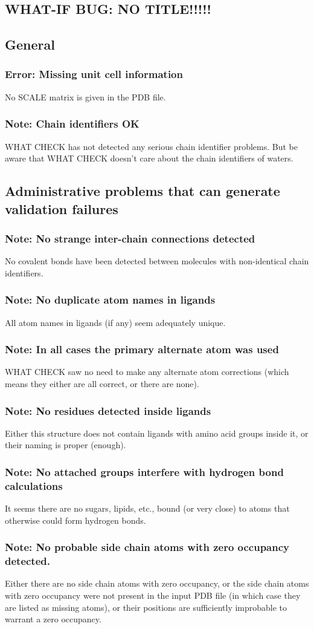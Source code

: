 \documentclass[a4paper]{article}
\def\showsect#1{
  \thesect\gdef\thesect{}
  \thessect\gdef\thessect{}
  \subsubsection{#1}
}
\def\ssect#1{
  \gdef\thessect{\subsection{#1}}
}
\gdef\thesect{\pagebreak[2]\section{WHAT-IF BUG: NO TITLE!!!!!}}
\gdef\thessect{\subsection{General}}
\begin{document}
\begin{error}
\showsect{Error: Missing unit cell information}
No SCALE matrix is given in the PDB file.
\end{error}

\begin{note}
\showsect{Note: Chain identifiers OK}
WHAT CHECK has not detected any serious chain identifier problems. But be
aware that WHAT CHECK doesn't care about the chain identifiers of waters.
\end{note}

\ssect{Administrative problems that can generate validation failures}
\begin{note}
\showsect{Note: No strange inter-chain connections detected}
No covalent bonds have been detected between molecules with non-identical
chain identifiers.
\end{note}

\begin{note}
\showsect{Note: No duplicate atom names in ligands}
All atom names in ligands (if any) seem adequately unique.
\end{note}

\begin{note}
\showsect{Note: In all cases the primary alternate atom was used}
WHAT CHECK saw no need to make any alternate atom corrections (which means
they either are all correct, or there are none).
\end{note}

\begin{note}
\showsect{Note: No residues detected inside ligands}
Either this structure does not contain ligands with amino acid groups inside
it, or their naming is proper (enough).
\end{note}

\begin{note}
\showsect{Note: No attached groups interfere with hydrogen bond calculations}
It seems there are no sugars, lipids, etc., bound (or very close) to atoms
that otherwise could form hydrogen bonds.
\end{note}

\begin{note}
\showsect{Note: No probable side chain atoms with zero occupancy detected.}
Either there are no side chain atoms with zero occupancy, or the side chain
atoms with zero occupancy were not present in the input PDB file (in which
case they are listed as missing atoms), or their positions are sufficiently
improbable to warrant a zero occupancy.
\end{note}
\end{document}
